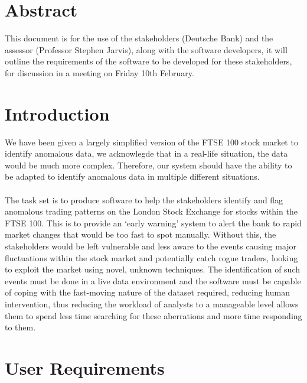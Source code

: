 \documentclass[11pt, oneside, a4paper]{article}
\begin{document}
\clearpage
\maketitle
\thispagestyle{empty}

\newpage
\setcounter{page}{1}

\section{Abstract}
This document is for the use of the stakeholders (Deutsche Bank) and the assessor (Professor Stephen Jarvis),
along with the software developers, it will outline the requirements of the software to be developed for
these stakeholders, for discussion in a meeting on Friday 10th February.

\section{Introduction}
We have been given a largely simplified version of the FTSE 100 stock market to identify anomalous data, we
acknowlegde that in a real-life situation, the data would be much more complex. Therefore, our system should
have the ability to be adapted to identify anomalous data in multiple different situations.\\\\
The task set is to produce software to help the stakeholders identify and flag anomalous trading patterns
on the London Stock Exchange for stocks within the FTSE 100. This is to provide an `early warning' system
to alert the bank to rapid market changes that would be too fast to spot manually. Without this, the
stakeholders would be left vulnerable and less aware to the events causing major fluctuations within the
stock market and potentially catch rogue traders, looking to exploit the market using novel, unknown techniques.
The identification of such events must be done in a live data environment and the software must be capable of
coping with the fast-moving nature of the dataset required, reducing human intervention, thus reducing the workload
of analysts to a manageable level allows them to spend less time searching for these aberrations and more time
responding to them.

\section{User Requirements}
\end{document}
